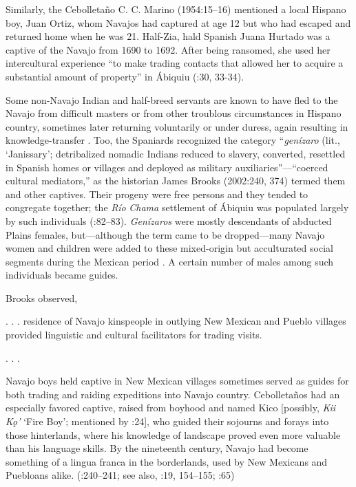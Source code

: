 Similarly, the Cebolletaño C. C. Marino (1954:15–16) mentioned a local Hispano boy, Juan Ortiz, whom Navajos had captured at age 12 but who had escaped and returned home when he was 21.  Half-Zia, hald Spanish Juana Hurtado was a captive of the Navajo from 1690 to 1692.  After being ransomed, she used her intercultural experience “to make trading contacts that allowed her to acquire a substantial amount of property” in Ábiquiu (\citealt{EbrightHendricks2006}:30, 33-34).

Some non-Navajo Indian and half-breed servants are known to have fled to the Navajo from difficult masters or from other troublous circumstances in Hispano country, sometimes later returning voluntarily or under duress, again resulting in knowledge-transfer \citep{Brugge1993b}.  Too, the Spaniards recognized the category “\textit{genízaro} (lit., ‘Janissary’; detribalized nomadic Indians reduced to slavery, converted, resettled in Spanish homes or villages and deployed as military auxiliaries”—“coerced cultural mediators,” as the historian James Brooks (2002:240, 374) termed them and other captives.  Their progeny were free persons and they tended to congregate together; the \textit{Río} \textit{Chama} settlement of Ábiquiu was populated largely by such individuals (\citealt{Kessell2013}:82–83).  \textit{Genízaros} were mostly descendants of abducted Plains females, but—although the term came to be dropped—many Navajo women and children were added to these mixed-origin but acculturated social segments during the Mexican period \citep{Chavez1979}.  A certain number of males among such individuals became guides.

Brooks observed,

. . . residence of Navajo kinspeople in outlying New Mexican and Pueblo villages provided linguistic and cultural facilitators for trading visits.

. . .

Navajo boys held captive in New Mexican villages sometimes served as guides for both trading and raiding expeditions into Navajo country.  Cebolletaños had an especially favored captive, raised from boyhood and named Kico [possibly, \textit{Kii} \textit{Kǫ’} ‘Fire Boy’; mentioned by \citealt{Marino1954}:24], who guided their sojourns and forays into those hinterlands, where his knowledge of landscape proved even more valuable than his language skills.  By the nineteenth century, Navajo had become something of a lingua franca in the borderlands, used by New Mexicans and Puebloans alike.  (\citealt{Brooks2002}:240–241; see also, \citealt{Briggs1976}:19, 154–155; \citealt{Underhill1956}:65)

